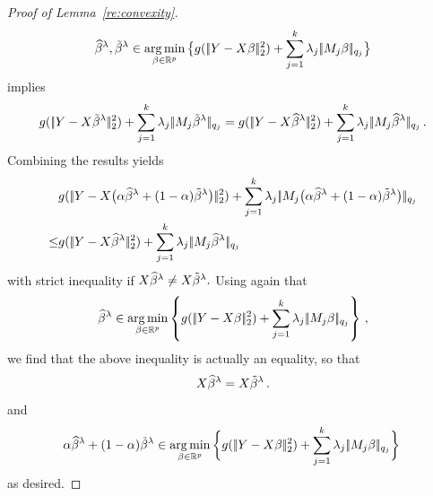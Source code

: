 \documentclass[bj]{imsart}
\newcommand{\normtwo}[1]{\ensuremath{\!|\!| #1 | \! |_{2}}}
\newcommand{\normqj}[1]{\ensuremath{\!|\!| #1 | \! |_{q_j}}}
\newcommand{\1}{{\rm 1}\mskip -4,5mu{\rm l} }
\newcommand{\argmin}{\mathop{\mathrm{arg\,min}}}
\def\R{\mathbb{R}}
\begin{document}
\begin{proof}[Proof of Lemma~\ref{re:convexity}]
\begin{equation*}
\estimatort, \tildeestimator  \in \argmin_{\beta\in\R^p} \big\{g(\,\normtwo{\outcome-\design\beta}^{2})+\sum_{j=1}^{\numbergroups}\lambda_j\,\normqj{\fusedmatrix_j\beta}\big\}  
\end{equation*}
implies 
\begin{align*}
g(\,\normtwo{\outcome-\design\tildeestimator}^{2})+\sum_{j=1}^{\numbergroups}\lambda_j\,\normqj{\fusedmatrix_j\tildeestimator}=g(\,\normtwo{\outcome-\design\estimatort}^{2})+\sum_{j=1}^{\numbergroups}\lambda_j\,\normqj{\fusedmatrix_j\estimatort}\,.
\end{align*}
Combining the results yields
\begin{align*}
&g(\,\normtwo{\outcome-\design\big(\alpha \estimatort+(1-\alpha)\tildeestimator\big)}^{2})+\sum_{j=1}^{\numbergroups}\lambda_j\,\normqj{\fusedmatrix_j\big(\alpha \estimatort+(1-\alpha)\tildeestimator\big)}\\
\leq&g(\,\normtwo{\outcome-\design\estimatort}^{2})+\sum_{j=1}^{\numbergroups} \lambda_j \,\normqj{\fusedmatrix_j\estimatort}
\end{align*}
with strict inequality if $\textcolor{black}{X}\widehat \beta^{\lambda}\neq \textcolor{black}{X} \tilde\beta^{\lambda}.$ Using again that 
\begin{equation*}
  \estimatort \in \argmin_{\beta\in\R^p} \left\{g(\,\normtwo{\outcome-\design\beta}^{2})+\sum_{j=1}^{\numbergroups}\lambda_j\,\normqj{\fusedmatrix_j\beta}\right\}\,,
\end{equation*}
we find that the above inequality is actually an equality, so that 
\begin{equation*}
\textcolor{black}{X}\widehat \beta^{\lambda}=\textcolor{black}{X}\tilde\beta^{\lambda}\,.
\end{equation*}
and
\begin{equation*}
\alpha\estimatort+(1-\alpha)\tildeestimator\in \argmin_{\beta\in\R^p} \bigg\{g(\,\normtwo{\outcome-\design\beta}^{2})+\sum_{j=1}^{\numbergroups}\lambda_j\,\normqj{\fusedmatrix_j\beta}\bigg\}\,
\end{equation*}
as desired.

\end{proof}
\end{document}
